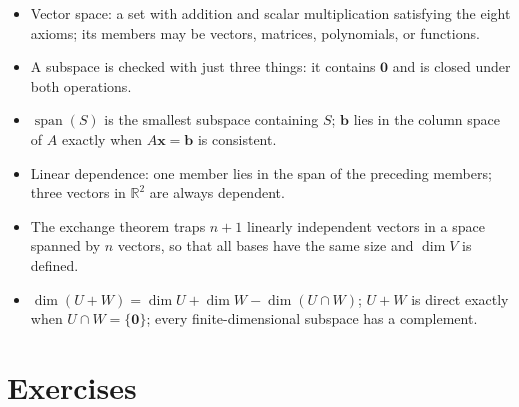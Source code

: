 \begin{ringkasan}
\begin{itemize}
  \item Vector space: a set with addition and scalar multiplication satisfying the eight
        axioms; its members may be vectors, matrices, polynomials, or functions.
  \item A subspace is checked with just three things: it contains $\mathbf{0}$ and is closed
        under both operations.
  \item $\operatorname{span}(S)$ is the smallest subspace containing $S$; $\mathbf{b}$ lies in
        the column space of $A$ exactly when $A\mathbf{x}=\mathbf{b}$ is consistent.
  \item Linear dependence: one member lies in the span of the preceding members; three vectors
        in $\mathbb{R}^{2}$ are always dependent.
  \item The exchange theorem traps $n+1$ linearly independent vectors in a space spanned by $n$
        vectors, so that all bases have the same size and $\dim V$ is defined.
  \item $\dim(U+W)=\dim U+\dim W-\dim(U\cap W)$; $U+W$ is direct exactly when
        $U\cap W=\{\mathbf{0}\}$; every finite-dimensional subspace has a complement.
\end{itemize}
\end{ringkasan}

\section{Exercises}

